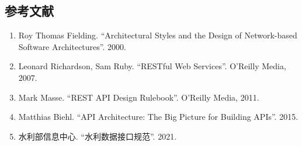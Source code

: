 \subsection{参考文献}\label{ux53c2ux8003ux6587ux732e}

\begin{enumerate}
\def\labelenumi{\arabic{enumi}.}
\tightlist
\item
  Roy Thomas Fielding. ``Architectural Styles and the Design of
  Network-based Software Architectures''. 2000.
\item
  Leonard Richardson, Sam Ruby. ``RESTful Web Services''. O'Reilly
  Media, 2007.
\item
  Mark Masse. ``REST API Design Rulebook''. O'Reilly Media, 2011.
\item
  Matthias Biehl. ``API Architecture: The Big Picture for Building
  APIs''. 2015.
\item
  水利部信息中心. ``水利数据接口规范''. 2021.
\end{enumerate}
